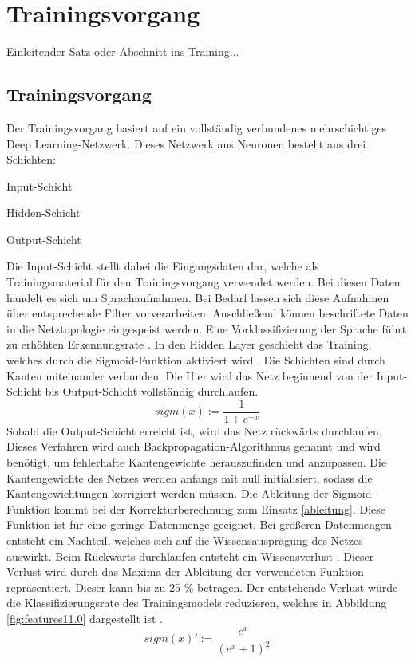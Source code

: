 \section{Trainingsvorgang}
Einleitender Satz oder Abschnitt ins Training...

\subsection{Trainingsvorgang}
Der Trainingsvorgang basiert auf ein vollständig verbundenes mehrschichtiges Deep Learning-Netzwerk. Dieses Netzwerk aus Neuronen besteht aus drei Schichten:
\begin{description}
	\item Input-Schicht
	\item Hidden-Schicht 
	\item Output-Schicht
\end{description}
Die Input-Schicht stellt dabei die Eingangsdaten dar, welche als Trainingsmaterial für den Trainingsvorgang verwendet werden. Bei diesen Daten handelt es sich um Sprachaufnahmen. Bei Bedarf lassen sich diese Aufnahmen über entsprechende Filter vorverarbeiten. Anschließend können beschriftete Daten in die Netztopologie eingespeist werden. Eine Vorklassifizierung der Sprache führt zu erhöhten Erkennungsrate \cite{bishop.2006}. In den Hidden Layer geschieht das Training, welches durch die Sigmoid-Funktion aktiviert wird \cite{bishop.2006}. Die Schichten sind durch Kanten miteinander verbunden. Die Hier wird das Netz beginnend von der Input-Schicht bis Output-Schicht vollständig durchlaufen.
\begin{equation*}
sigm(x) :=\frac{ 1 }{1+e^{-x}  }
\label{normal}
\end{equation*}
Sobald die Output-Schicht erreicht ist, wird das Netz rückwärts durchlaufen. Dieses Verfahren wird auch Backpropagation-Algorithmus genannt und wird benötigt, um fehlerhafte Kantengewichte herauszufinden und anzupassen. Die Kantengewichte des Netzes werden anfangs mit null initialisiert, sodass die Kantengewichtungen korrigiert werden müssen. Die Ableitung der Sigmoid-Funktion kommt bei der Korrekturberechnung zum Einsatz \ref{ableitung}. Diese Funktion ist für eine geringe Datenmenge geeignet. Bei größeren Datenmengen entsteht ein Nachteil, welches sich auf die Wissensausprägung des Netzes auswirkt. Beim Rückwärts durchlaufen entsteht ein Wissensverlust \cite{bishop.2006}. Dieser Verlust wird durch das Maxima der Ableitung der verwendeten Funktion repräsentiert. Dieser kann bis zu 25 \% betragen. Der entstehende Verlust würde die Klassifizierungsrate des Trainingsmodels reduzieren, welches in Abbildung \ref{fig:features11.0} dargestellt ist \cite{Kulbear.2017}.
\begin{equation*}
sigm(x)':= \frac{ e^{x} }{(e^{x} +1)^2  }
\label{ableitung}
\end{equation*}

